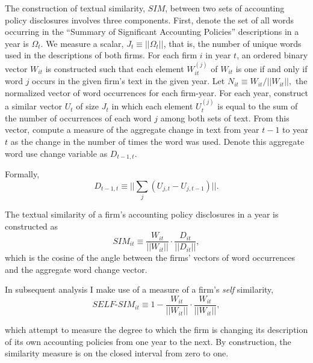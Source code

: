 \documentclass[thesis]{thesis-umich}
\begin{document}
The construction of textual similarity, $SIM$,  between two sets of accounting policy disclosures involves three components. First, denote  the set of all words occurring in the ``Summary of Significant Accounting Policies'' descriptions in a year is $\Omega_t$. We measure a  scalar, $J_t \equiv \vert\vert \Omega_t \vert\vert$, that is, the number of unique words used in  the descriptions of both firms. For each firm $i$ in year  $t$, an ordered binary vector $W_{it}$ is constructed such that each element $W^{(j)}_{it}$ of  $W_{it}$ is one if and only if word $j$ occurs in the given firm's text in the given  year. Let $N_{it} \equiv W_{it}/\vert\vert W_{it} \vert\vert,$ the normalized vector of word  occurrences for each firm-year. For each year, construct a similar vector $U_t$ of size $J_t$ in  which each element $U^{(j)}_t$ is equal to the sum of the number of occurrences of each word $j$  among both sets of text. From this vector, compute a measure of the aggregate  change in text from year $t-1$ to year $t$ as the change in the number of times the word was used. Denote this aggregate word use change variable as  $D_{t-1,t}$. 

Formally,
\begin{equation}
D_{t-1,t} \equiv \bigg\vert\bigg\vert \sum_{j} (U_{j,t} - U_{j, t-1}) \bigg\vert\bigg\vert.
\end{equation}

The textual similarity of a firm's accounting policy disclosures in a year is constructed as
\begin{equation}
SIM_{it} \equiv \frac{W_{it}}{\vert\vert W_{it} \vert\vert} \cdot \frac{D_{it}}{\vert\vert D_{it} 
\vert\vert},
\end{equation}
which is the cosine of the angle between the firms' vectors of word occurrences and the aggregate word change vector.

In subsequent analysis I make use of a measure of a firm's \emph{self} similarity, 
\begin{equation}
SELF\text{-}SIM_{it} \equiv 1 - \frac{W_{it}}{\vert\vert W_{it} \vert\vert} \cdot \frac{W_{it}}{\vert\vert 
W_{it} \vert\vert},
\end{equation}

which attempt to measure the degree to which the firm is changing its description of its own accounting policies from one year to the next. By construction,  the similarity measure is on the closed interval from zero to one. 
\end{document}
